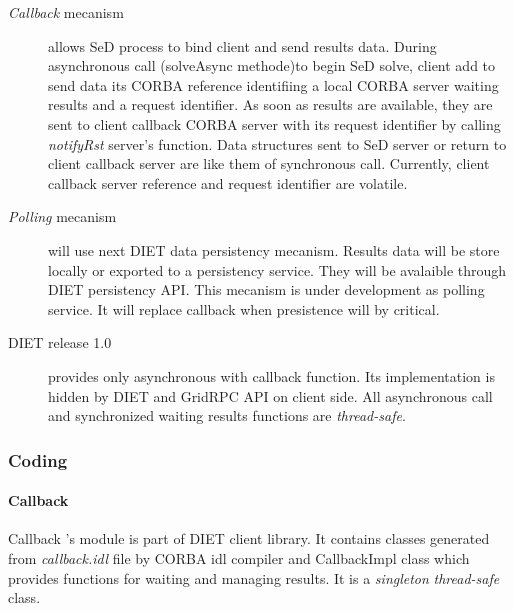   \begin{description}
  \item[\emph{Callback} mecanism] allows SeD process to bind client and send results data.
  During asynchronous call (solveAsync methode)to begin SeD solve, client
  add to send data its CORBA reference identifiing a local CORBA server
  waiting results and a request identifier.
  As soon as results are available, they are sent to client callback CORBA server
  with its request identifier by calling \emph{notifyRst} server's function.
  Data structures sent to SeD server or return to client callback server are like
  them of synchronous call. Currently, client callback server reference and request
  identifier are volatile.
  \item[\emph{Polling} mecanism] will use next DIET data persistency mecanism.
  Results data will be store locally or exported to a persistency service.
  They will be avalaible through DIET persistency API. This mecanism is under
  development as polling service. It will replace callback when presistence will
  by critical.
  \item[DIET release 1.0] provides only asynchronous with callback function. Its
  implementation is hidden by DIET and GridRPC API on client side. All asynchronous call
  and synchronized waiting results functions are \emph{thread-safe}.
  \end{description}

  \subsubsection{Coding}
  \paragraph{Callback}
  Callback 's module is part of DIET client library. It contains classes generated
  from \emph{callback.idl} file by CORBA idl compiler and CallbackImpl class
  which provides functions for waiting and managing results. It is a \emph{singleton}
  \emph{thread-safe} class.

